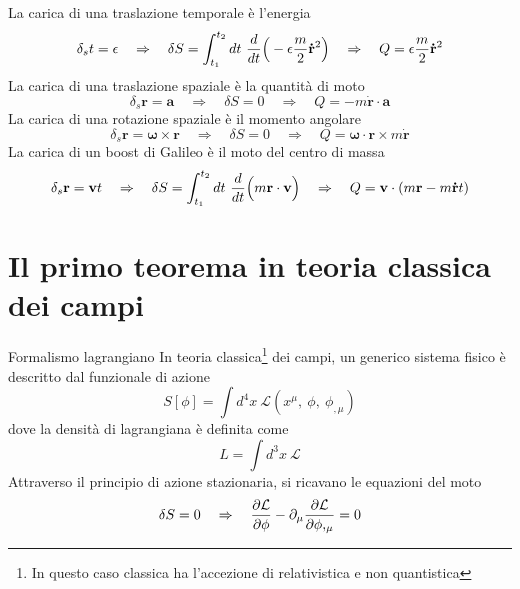 \begin{frame}  
    La carica di una traslazione temporale è l'energia
    \begin{equation*}
        \delta_s t = \epsilon \quad \Rightarrow \quad \delta S = \int_{t_1}^{t_2}dt~ \frac{d}{dt} \Big( -\epsilon \frac{m}{2} \mathbf{\dot r}^2 \Big) \quad \Rightarrow \quad  Q = \epsilon \frac{m}{2} \mathbf{\dot r}^2 
    \end{equation*}
      La carica di una traslazione spaziale è la quantità di moto
    \begin{equation*}
        \delta_s \mathbf r = \mathbf a \quad \Rightarrow \quad \delta S = 0 \quad \Rightarrow \quad  Q = - m \mathbf{\dot r} \cdot \mathbf a
    \end{equation*}
      La carica di una rotazione spaziale è il momento angolare
    \begin{equation*}
        \delta_s \mathbf r = \boldsymbol \omega \times \mathbf r \quad \Rightarrow \quad \delta S = 0 \quad \Rightarrow \quad  Q = \boldsymbol \omega \cdot \mathbf r \times m \mathbf{\dot r} 
    \end{equation*}
      La carica di un boost di Galileo è il moto del centro di massa
    \begin{equation*}
        \delta_s \mathbf r = \mathbf v t \quad \Rightarrow \quad \delta S = \int_{t_1}^{t_2}dt~ \frac{d}{dt} \Big( m \mathbf r \cdot \mathbf v \Big)  \quad \Rightarrow \quad  Q = \mathbf v \cdot (m \mathbf r - m \mathbf{\dot r} t)
    \end{equation*}
\end{frame}

\section{Il primo teorema in teoria classica dei campi}

\begin{frame}{Formalismo lagrangiano}
    In teoria classica\footnote{In questo caso classica ha l'accezione di relativistica e non quantistica} dei campi, un generico sistema fisico è descritto dal funzionale di azione
    \begin{equation*}
        S[\phi] = \int d^4 x ~ \mathcal L (x^\mu,~\phi,~\phi_{, \mu})
    \end{equation*} 
    dove la densità di lagrangiana è definita come
    \begin{equation*}
        L = \int d^3 x ~ \mathcal L
    \end{equation*}  
      Attraverso il principio di azione stazionaria, si ricavano le equazioni del moto 
    \begin{equation*}
        \delta S = 0 \quad \Rightarrow \quad \frac{\partial\mathcal L}{\partial\phi} - \partial_\mu \frac{\partial\mathcal L}{\partial\phi,_\mu} = 0
    \end{equation*}
\end{frame}

